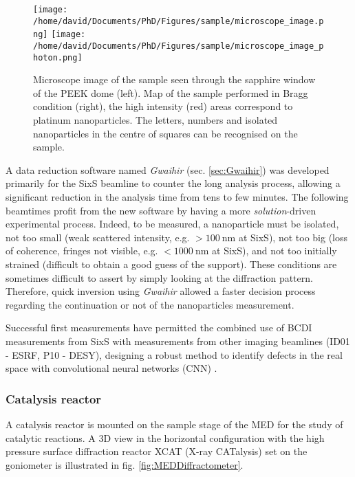 \begin{figure}[!htb]
    \centering
    \texttt{[image: /home/david/Documents/PhD/Figures/sample/microscope\_image.png]}
    \texttt{[image: /home/david/Documents/PhD/Figures/sample/microscope\_image\_photon.png]}
    \caption{
        Microscope image of the sample seen through the sapphire window of the PEEK dome (left).
        Map of the sample performed in Bragg condition (right), the high intensity (red) areas correspond to platinum nanoparticles.
        The letters, numbers and isolated nanoparticles in the centre of squares can be recognised on the sample.
    }
    \label{fig:SampleMapping}
\end{figure}

A data reduction software named \textit{Gwaihir} (sec. \ref{sec:Gwaihir}) was developed primarily for the SixS beamline to counter the long analysis process, allowing a significant reduction in the analysis time from tens to few minutes.
The following beamtimes profit from the new software by having a more \textit{solution}-driven experimental process.
Indeed, to be measured, a nanoparticle must be isolated, not too small (weak scattered intensity, e.g. $>\qty{100}{\nm}$ at SixS), not too big (loss of coherence, fringes not visible, e.g. $<\qty{1000}{\nm}$ at SixS), and not too initially strained (difficult to obtain a good guess of the support).
These conditions are sometimes difficult to assert by simply looking at the diffraction pattern.
Therefore, quick inversion using \textit{Gwaihir} allowed a faster decision process regarding the continuation or not of the nanoparticles measurement.

Successful first measurements have permitted the combined use of BCDI measurements from SixS with measurements from other imaging beamlines (ID01 - ESRF, P10 - DESY), designing a robust method to identify defects in the real space with convolutional neural networks (CNN) \parencite{Lim2021}.

\subsubsection{Catalysis reactor}\label{sec:XCAT}

A catalysis reactor is mounted on the sample stage of the MED for the study of catalytic reactions.
A 3D view in the horizontal configuration with the high pressure surface diffraction reactor XCAT (X-ray CATalysis) set on the goniometer is illustrated in fig. \ref{fig:MEDDiffractometer}.

